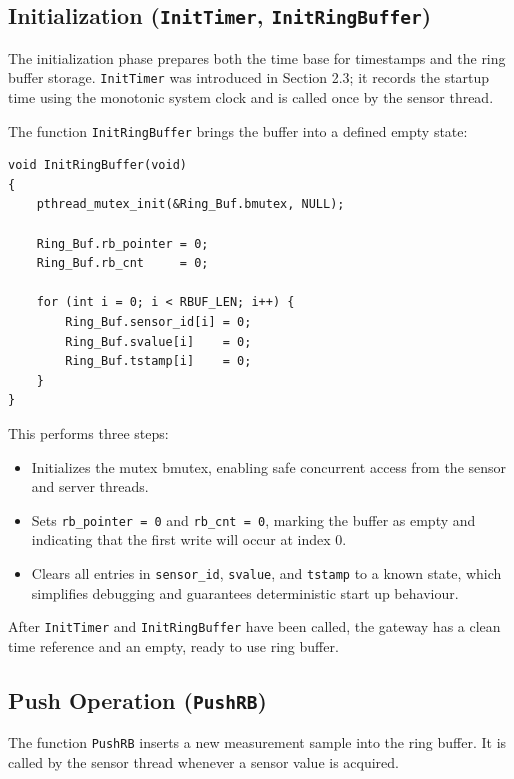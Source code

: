 \subsection{Initialization (\texttt{InitTimer}, \texttt{InitRingBuffer})}
The initialization phase prepares both the time base for timestamps and the ring buffer storage. \texttt{InitTimer} was introduced in Section 2.3; it records the startup time using the monotonic system clock and is called once by the sensor thread.

The function \texttt{InitRingBuffer} brings the buffer into a defined empty state:
\begin{verbatim}
void InitRingBuffer(void)
{
    pthread_mutex_init(&Ring_Buf.bmutex, NULL);

    Ring_Buf.rb_pointer = 0;
    Ring_Buf.rb_cnt     = 0;

    for (int i = 0; i < RBUF_LEN; i++) {
        Ring_Buf.sensor_id[i] = 0;
        Ring_Buf.svalue[i]    = 0;
        Ring_Buf.tstamp[i]    = 0;
    }
}
\end{verbatim}
This performs three steps:
\begin{itemize}
\item Initializes the mutex bmutex, enabling safe concurrent access from the sensor and server threads.
\item Sets \texttt{rb\_pointer = 0} and \texttt{rb\_cnt = 0}, marking the buffer as empty and indicating that the first write will occur at index 0.
\item Clears all entries in \texttt{sensor\_id}, \texttt{svalue}, and \texttt{tstamp} to a known state, which simplifies debugging and guarantees deterministic start up behaviour.
\end{itemize}
After \texttt{InitTimer} and \texttt{InitRingBuffer} have been called, the gateway has a clean time reference and an empty, ready to use ring buffer.


\subsection{Push Operation (\texttt{PushRB})}
The function \texttt{PushRB} inserts a new measurement sample into the ring buffer. It is called by the sensor thread whenever a sensor value is acquired.

